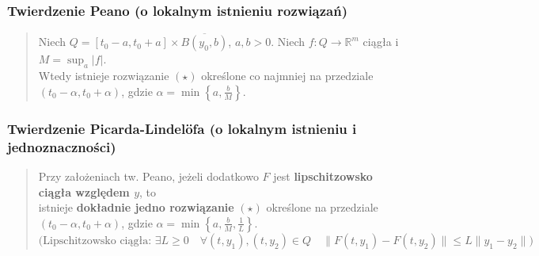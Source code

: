 \documentclass[10pt,a4paper]{article}
\begin{document}
{\subsubsection*{Twierdzenie Peano (o lokalnym istnieniu rozwiązań)}
\begin{quote}
Niech $Q=[t_0-a, t_0+a] \times \overline{B(y_0, b)}$, $a, b > 0$. Niech $f: Q \to \mathbb{R}^m$ ciągła i $M=\sup_a |f|$.\\
Wtedy istnieje rozwiązanie $(\star)$ określone
co najmniej na przedziale $(t_0-\alpha, t_0+\alpha)$,
gdzie $\alpha = \min \left\{a, \frac{b}{M}\right\}$.
\end{quote}

\subsubsection*{Twierdzenie Picarda-Lindelöfa (o lokalnym istnieniu i jednoznaczności)}
\begin{quote}
Przy założeniach tw. Peano, jeżeli dodatkowo $F$ jest
\textbf{lipschitzowsko ciągła względem $y$}, to \\ istnieje
\textbf{dokładnie jedno rozwiązanie} $(\star)$ określone na
przedziale $(t_0-\alpha, t_0+\alpha)$, gdzie $\alpha = \min \left\{a, \frac{b}{M}, \frac{1}{L}\right\}$.\\
$$\text{(Lipschitzowsko ciągła: } \exists L \ge 0 \quad \forall (t,y_1), (t,y_2) \in Q \quad \|F(t,y_1) - F(t,y_2)\| \le L \|y_1-y_2\| \text{)}$$
\end{quote}
}
\end{document}

